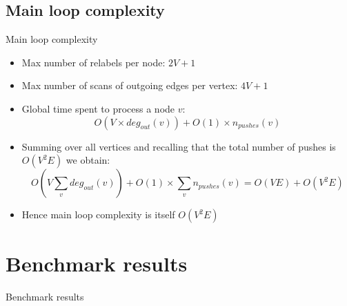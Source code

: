 \documentclass{beamer}
\begin{document}
\subsection{Main loop complexity}
\begin{frame}[fragile]{Main loop complexity}
    \begin{itemize}
        \item Max number of relabels per node: $2V+1$
        \pause
        \item Max number of scans of outgoing edges per vertex: $4V+1$
        \pause
        \item Global time spent to process a node $v$:
              $$O(V\times deg_{out}(v))+O(1)\times n_{pushes}(v)$$
        \pause
        \item Summing over all vertices and recalling that the total number of pushes is $O(V^{2}E)$ we obtain:
              $$O(V \sum_{v} deg_{out}(v)) + O(1) \times \sum_{v} n_{pushes}(v) = O(VE) + O(V^{2}E)$$
        \pause
        \item Hence main loop complexity is itself $O(V^{2}E)$
    \end{itemize}
\end{frame}

\section{Benchmark results}

\begin{frame}[fragile]{Benchmark results}
\end{frame}
\end{document}
